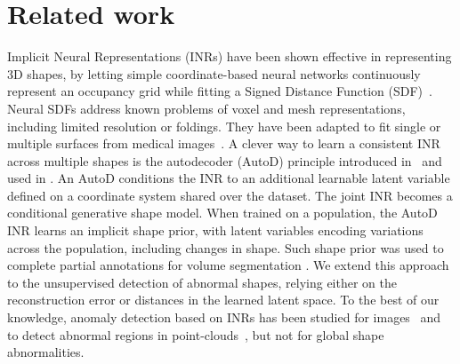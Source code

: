 \section{Related work}
\label{sec:related_work}
Implicit Neural Representations (INRs) have been shown effective in representing 3D shapes, by letting simple coordinate-based neural networks continuously represent an occupancy grid while fitting a Signed Distance Function (SDF)~\cite{Gropp}. Neural SDFs address known problems of voxel and mesh representations, including limited resolution or foldings. They have been adapted to fit single or multiple surfaces from medical images~\cite{alblas:heart-workshop2022:atlas,AMIRANASHVILI2024}. A clever way to learn a consistent INR across multiple shapes is the autodecoder (AutoD) principle introduced in~\cite{park:cvpr2019:deepsdf} and used in \cite{AMIRANASHVILI2024}. An AutoD conditions the INR to an additional learnable latent variable defined on a coordinate system shared over the dataset. The joint INR  becomes a conditional generative shape model. 
When trained on a population, the AutoD INR learns an implicit shape prior, with latent variables encoding variations across the population, including  changes in shape. Such shape prior was used to complete partial annotations for volume segmentation \cite{AMIRANASHVILI2024}. 
We extend this approach to the unsupervised detection of abnormal shapes, relying either on the reconstruction error or distances in the learned latent space. To the best of our knowledge, anomaly detection based on INRs has been studied for images~\cite{naval:miccai2021:anomaly-images} and to detect abnormal regions in point-clouds~\cite{bergmann:wacv2023:anomaly-points}, but not for global shape abnormalities.